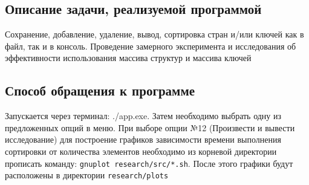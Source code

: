 \subsection{Описание задачи, реализуемой программой}
	Сохранение, добавление, удаление, вывод, сортировка стран и/или ключей как в файл, так и в консоль. Проведение замерного эксперимента и исследования об эффективности использования массива структур и массива ключей

\subsection{Способ обращения к программе}
	Запускается через терминал: ./app.exe. Затем необходимо выбрать одну из предложенных опций в меню. При выборе опции №12 (Произвести и вывести исследование) для построение графиков зависимости времени выполнения сортировки от количества элементов необходимо из корневой директории прописать команду: \texttt{gnuplot research/src/*.sh}. После этого графики будут расположены в директории \texttt{research/plots}

